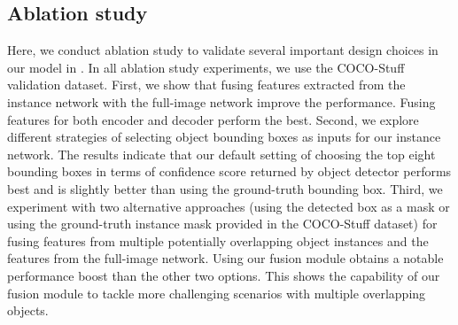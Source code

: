 \begin{table*}[t!]
\begin{subtable}[t]{0.325\textwidth}
{        }
        \label{tab:ablation_box}
    \end{subtable}
    \hfill
    \begin{subtable}[t]{0.325\textwidth}
        \centering
        \caption{Different Weighted Sum}
        \label{tab:ablation_mask}
    \end{subtable}
\end{table*} 
\subsection{Ablation study}
\label{sec:ablation}
Here, we conduct ablation study to validate several important design choices in our model in .
In all ablation study experiments, we use the COCO-Stuff validation dataset. 
First, we show that fusing features extracted from the instance network with the full-image network improve the performance.
Fusing features for both encoder and decoder perform the best. 
Second, we explore different strategies of selecting object bounding boxes as inputs for our instance network.
The results indicate that our default setting of choosing the top eight bounding boxes in terms of confidence score returned by object detector performs best and is slightly better than using the ground-truth bounding box.  
Third, we experiment with two alternative approaches (using the detected box as a mask or using the ground-truth instance mask provided in the COCO-Stuff dataset) for fusing features from multiple potentially overlapping object instances and the features from the full-image network.
Using our fusion module obtains a notable performance boost than the other two options.
This shows the capability of our fusion module to tackle more challenging scenarios with multiple overlapping objects.

